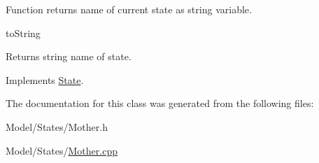 Function returns name of current state as string variable. 

to\+String \begin{DoxyReturn}{Returns}
string name of state. 
\end{DoxyReturn}


Implements \hyperlink{class_state_afabc279037b4526ec161e6f8988855a9}{State}.



The documentation for this class was generated from the following files\+:\begin{DoxyCompactItemize}
\item 
Model/\+States/Mother.\+h\item 
Model/\+States/\hyperlink{_mother_8cpp}{Mother.\+cpp}\end{DoxyCompactItemize}
